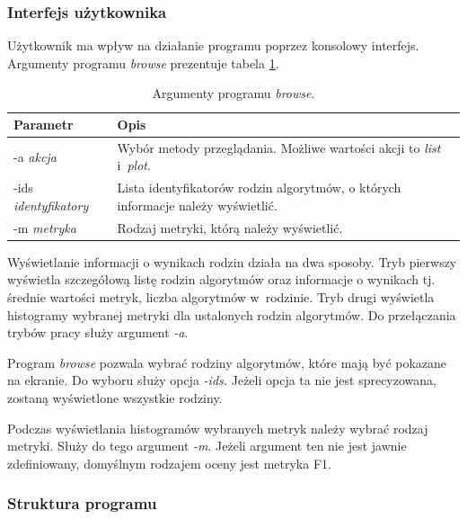 \documentclass[../thesis.tex]{subfiles}
\begin{document}
\subsubsection{Interfejs użytkownika}

Użytkownik ma wpływ na działanie programu poprzez konsolowy interfejs. Argumenty programu \emph{browse} prezentuje tabela \ref{proj:table_browse_args}.

\begin{table}[h]
\begin{center}
\begin{tabular}{ | l | p{110mm} | }
\hline
\rowcolor{lightgray} Parametr & Opis \\\hline

-a \emph{akcja} & Wybór metody przeglądania. Możliwe wartości akcji to \emph{list} i~\emph{plot}.\\\hline
-ids \emph{identyfikatory} & Lista identyfikatorów rodzin algorytmów, o których informacje należy wyświetlić.\\\hline
-m \emph{metryka} & Rodzaj metryki, którą należy wyświetlić.\\\hline

\end{tabular}
\caption{Argumenty programu \emph{browse}.}
\label{proj:table_browse_args}
\end{center}
\end{table}

Wyświetlanie informacji o wynikach rodzin działa na dwa sposoby. Tryb pierwszy wyświetla szczegółową listę rodzin algorytmów oraz informacje o wynikach tj. średnie wartości metryk, liczba algorytmów w~rodzinie. Tryb drugi wyświetla histogramy wybranej metryki dla ustalonych rodzin algorytmów. Do przełączania trybów pracy służy argument \emph{-a}.

Program \emph{browse} pozwala wybrać rodziny algorytmów, które mają być pokazane na ekranie. Do wyboru służy opcja \emph{-ids.} Jeżeli opcja ta nie jest sprecyzowana, zostaną wyświetlone wszystkie rodziny.

Podczas wyświetlania histogramów wybranych metryk należy wybrać rodzaj metryki. Służy do tego argument \emph{-m}. Jeżeli argument ten nie jest jawnie zdefiniowany, domyślnym rodzajem oceny jest metryka F1.

\subsubsection{Struktura programu}
\end{document}
